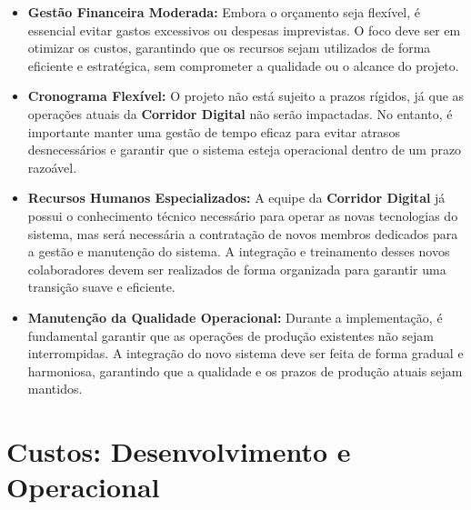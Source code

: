 \begin{itemize}
    \item \textbf{Gestão Financeira Moderada:} Embora o orçamento seja flexível, é essencial evitar gastos excessivos ou despesas imprevistas. O foco deve ser em otimizar os custos, garantindo que os recursos sejam utilizados de forma eficiente e estratégica, sem comprometer a qualidade ou o alcance do projeto.
    
    \item \textbf{Cronograma Flexível:} O projeto não está sujeito a prazos rígidos, já que as operações atuais da \textbf{Corridor Digital} não serão impactadas. No entanto, é importante manter uma gestão de tempo eficaz para evitar atrasos desnecessários e garantir que o sistema esteja operacional dentro de um prazo razoável.
    
    \item \textbf{Recursos Humanos Especializados:} A equipe da \textbf{Corridor Digital} já possui o conhecimento técnico necessário para operar as novas tecnologias do sistema, mas será necessária a contratação de novos membros dedicados para a gestão e manutenção do sistema. A integração e treinamento desses novos colaboradores devem ser realizados de forma organizada para garantir uma transição suave e eficiente.
    
    \item \textbf{Manutenção da Qualidade Operacional:} Durante a implementação, é fundamental garantir que as operações de produção existentes não sejam interrompidas. A integração do novo sistema deve ser feita de forma gradual e harmoniosa, garantindo que a qualidade e os prazos de produção atuais sejam mantidos.
\end{itemize}


\section{Custos: Desenvolvimento e Operacional}

